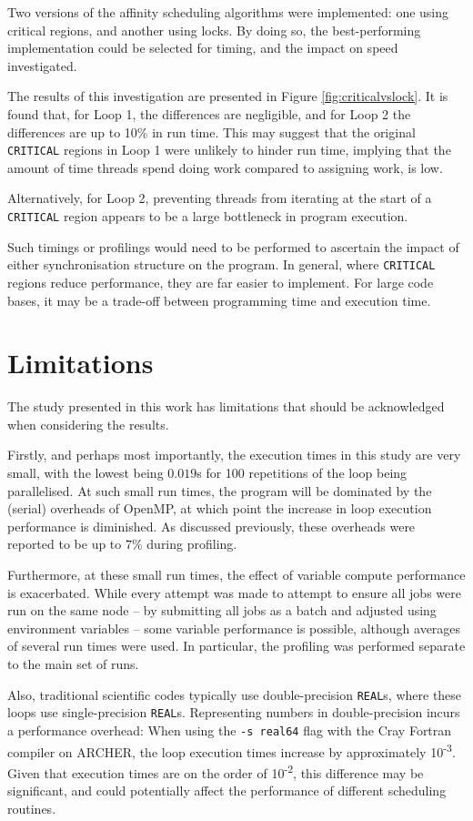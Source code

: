 \documentclass{article} %
\newcommand{\tp}{\texttt}
\begin{document}
Two versions of the affinity scheduling algorithms were implemented: one using critical regions, and another using locks.
By doing so, the best-performing implementation could be selected for timing, and the impact on speed investigated.

The results of this investigation are presented in Figure \ref{fig:criticalvslock}. 
It is found that, for Loop 1, the differences are negligible, and for Loop 2 the differences are up to 10\% in run time.
This may suggest that the original \tp{CRITICAL} regions in Loop 1 were unlikely to hinder run time, implying that the amount of time threads spend doing work compared to assigning work, is low.

Alternatively, for Loop 2, preventing threads from iterating at the start of a \tp{CRITICAL} region appears to be a large bottleneck in program execution.

Such timings or profilings would need to be performed to ascertain the impact of either synchronisation structure on the program.
In general, where \tp{CRITICAL} regions reduce performance, they are far easier to implement.
For large code bases, it may be a trade-off between programming time and execution time.

\section*{Limitations}

The study presented in this work has limitations that should be acknowledged when considering the results.

Firstly, and perhaps most importantly, the execution times in this study are very small, with the lowest being $0.019$s for 100 repetitions of the loop being parallelised.
At such small run times, the program will be dominated by the (serial) overheads of OpenMP, at which point the increase in loop execution performance is diminished.
As discussed previously, these overheads were reported to be up to $7\%$ during profiling. 

Furthermore, at these small run times, the effect of variable compute performance is exacerbated. 
While every attempt was made to attempt to ensure all jobs were run on the same node -- by submitting all jobs as a batch and adjusted using environment variables -- some variable performance is possible, although averages of several run times were used.
In particular, the profiling was performed separate to the main set of runs.

Also, traditional scientific codes typically use double-precision \tp{REAL}s, where these loops use single-precision \tp{REAL}s.
Representing numbers in double-precision incurs a performance overhead:
When using the \tp{-s real64} flag with the Cray Fortran compiler on ARCHER, the loop execution times increase by approximately 10\textsuperscript{-3}.
Given that execution times are on the order of 10\textsuperscript{-2}, this difference may be significant, and could potentially affect the performance of different scheduling routines.
\end{document}
